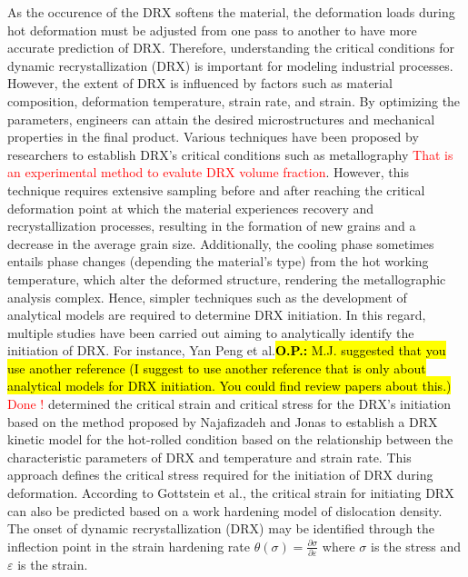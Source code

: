 \documentclass[metals,article,submit,pdftex,moreauthors]{Definitions/mdpi}
\makeatletter
\DeclareRobustCommand{\eal}{et al.\@\xspace}
\DeclareRobustCommand{\OP}[1]{\begingroup\sethlcolor{VWyellow}\textcolor{red}{\hl{\textbf{O.P.:} #1}}\endgroup}
\makeatother
\begin{document}
As the occurence of the DRX softens the material, the deformation loads during hot deformation must be adjusted from one pass to another to have more accurate prediction of DRX.
Therefore, understanding the critical conditions for dynamic recrystallization (DRX) is important for modeling industrial processes.
However, the extent of DRX is influenced by factors such as material composition, deformation temperature, strain rate, and strain.
By optimizing the parameters, engineers can attain the desired microstructures and mechanical properties in the final product.
Various techniques have been proposed by researchers to establish DRX's critical conditions such as metallography \cite{babu2022implication} \textcolor{red}{That is an experimental method to evalute DRX volume fraction}.
However, this technique requires extensive sampling before and after reaching the critical deformation point at which the material experiences recovery and recrystallization processes, resulting in the formation of new grains and a decrease in the average grain size.
Additionally, the cooling phase sometimes entails phase changes (depending the material's type) from the hot working temperature, which alter the deformed structure, rendering the metallographic analysis complex.
Hence, simpler techniques such as the development of analytical models are required to determine DRX initiation.
In this regard, multiple studies have been carried out aiming to analytically identify the initiation of DRX.
For instance, Yan Peng \eal \cite{peng2022dynamic}\OP{M.J. suggested that you use another reference (I suggest to use another reference that is only about analytical models for DRX initiation. You could find review papers about this.)} \textcolor{red}{Done !} determined the critical strain and critical stress for the DRX's initiation based on the method proposed by Najafizadeh and Jonas \cite{Najafizadeh-2006} to establish a DRX kinetic model for the hot-rolled condition based on the relationship between the characteristic parameters of DRX and temperature and strain rate. This approach defines the critical stress required for the initiation of DRX during deformation.
According to Gottstein \eal \cite{gottstein2004prediction}, the critical strain for initiating DRX can also be predicted based on a work hardening model of dislocation density.
The onset of dynamic recrystallization (DRX) may be identified through the inflection point in the strain hardening rate $\theta(\sigma)=\frac{\partial \sigma}{\partial \varepsilon}$ where $\sigma$ is the stress and $\varepsilon$ is the strain.
\end{document}
